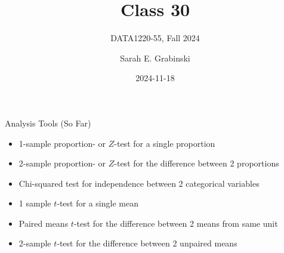 \documentclass[
  ignorenonframetext,
]{beamer}
\title{Class 30}
\subtitle{DATA1220-55, Fall 2024}
\author{Sarah E. Grabinski}
\date{2024-11-18}
\providecommand{\tightlist}{%
  \setlength{\itemsep}{0pt}\setlength{\parskip}{0pt}}\usepackage{longtable,booktabs,array}
\begin{document}
\frame{\titlepage}


\begin{frame}{Analysis Tools (So Far)}
\label{analysis-tools-so-far}
\begin{itemize}
\tightlist
\item
  1-sample proportion- or \(Z\)-test for a single proportion
\end{itemize}

\pause

\begin{itemize}
\tightlist
\item
  2-sample proportion- or \(Z\)-test for the difference between 2
  proportions
\end{itemize}

\pause

\begin{itemize}
\tightlist
\item
  Chi-squared test for independence between 2 categorical variables
\end{itemize}

\pause

\begin{itemize}
\tightlist
\item
  1 sample \(t\)-test for a single mean
\end{itemize}

\pause

\begin{itemize}
\tightlist
\item
  Paired means \(t\)-test for the difference between 2 means from same
  unit
\end{itemize}

\pause

\begin{itemize}
\tightlist
\item
  2-sample \(t\)-test for the difference between 2 unpaired means
\end{itemize}
\end{frame}
\end{document}
